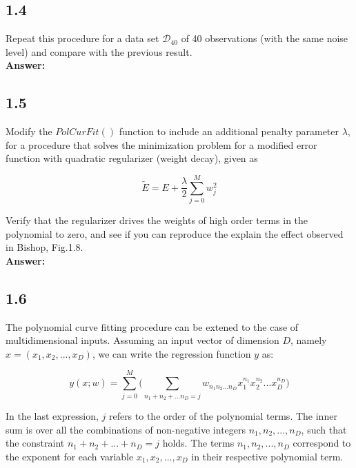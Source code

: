 \documentclass[a4paper]{article}
\begin{document}
\subsection*{1.4}


Repeat this procedure for a data set $\mathcal{D}_{40}$ of 40 observations (with the same noise level) and compare with the previous result.\\

\textbf{Answer:}\\


\subsection*{1.5}

Modify the $PolCurFit()$ function to include an additional penalty parameter $\lambda$, for a procedure that solves the minimization problem for a modified error function with quadratic regularizer (weight decay), given as 

\begin{equation}
	\widetilde{E} = E + \frac{\lambda}{2} \sum_{j = 0}^M w_j^2
\end{equation}

Verify that the regularizer drives the weights of high order terms in the polynomial to zero, and see if you can reproduce the explain the effect observed in Bishop, Fig.1.8.\\

\textbf{Answer:}\\


\subsection*{1.6}

The polynomial curve fitting procedure can be extened to the case of multidimensional inputs. Assuming an input vector of dimension $D$, namely $x = (x_1,x_2,...,x_D)$, we can write the regression function $y$ as:

\begin{equation}
	y(x;w) = \sum_{j=0}^M \Bigg( \sum_{n_1+n_2+...n_D=j} w_{n_1 n_2...n_D}x_1^{n_1}x_2^{n_2} ... x_D^{n_D}\Bigg)
\end{equation}

In the last expression, $j$ refers to the order of the polynomial terms. The inner sum is over all the combinations of non-negative integers $n_1, n_2, ..., n_D$, such that the constraint $n_1+ n_2 + ... + n_D = j$ holds. The terms $n_1, n_2,..., n_D$ correspond to the exponent for each variable $x_1,x_2,...,x_D$ in their respective polynomial term.\\
\end{document}
